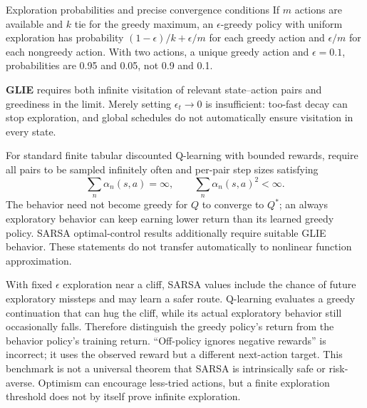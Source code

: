 \documentclass[10pt,a4paper]{article}
\begin{document}
\begin{card}{Exploration probabilities and precise convergence conditions}
If $m$ actions are available and $k$ tie for the greedy maximum, an $\epsilon$-greedy policy with uniform exploration has probability $(1-\epsilon)/k+\epsilon/m$ for each greedy action and $\epsilon/m$ for each nongreedy action. With two actions, a unique greedy action and $\epsilon=0.1$, probabilities are 0.95 and 0.05, not 0.9 and 0.1.

\textbf{GLIE} requires both infinite visitation of relevant state--action pairs and greediness in the limit. Merely setting $\epsilon_t\to0$ is insufficient: too-fast decay can stop exploration, and global schedules do not automatically ensure visitation in every state.

For standard finite tabular discounted Q-learning with bounded rewards, require all pairs to be sampled infinitely often and per-pair step sizes satisfying
\[
\sum_n\alpha_n(s,a)=\infty,\qquad \sum_n\alpha_n(s,a)^2<\infty.
\]
The behavior need not become greedy for $Q$ to converge to $Q^*$; an always exploratory behavior can keep earning lower return than its learned greedy policy. SARSA optimal-control results additionally require suitable GLIE behavior. These statements do not transfer automatically to nonlinear function approximation.
\end{card}

\begin{idea}
With fixed $\epsilon$ exploration near a cliff, SARSA values include the chance of future exploratory missteps and may learn a safer route. Q-learning evaluates a greedy continuation that can hug the cliff, while its actual exploratory behavior still occasionally falls. Therefore distinguish the greedy policy's return from the behavior policy's training return. ``Off-policy ignores negative rewards'' is incorrect; it uses the observed reward but a different next-action target.
This benchmark is not a universal theorem that SARSA is intrinsically safe or risk-averse. Optimism can encourage less-tried actions, but a finite exploration threshold does not by itself prove infinite exploration.
\end{idea}
\end{document}
